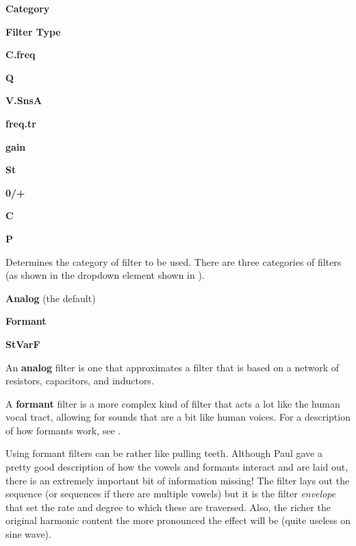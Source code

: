    \begin{enumber}
      \item \textbf{Category}
      \item \textbf{Filter Type}
      \item \textbf{C.freq}
      \item \textbf{Q}
      \item \textbf{V.SnsA}
      \item \textbf{freq.tr}
      \item \textbf{gain}
      \item \textbf{St}
      \item \textbf{0/+}
      \item \textbf{C}
      \item \textbf{P}
   \end{enumber}

   \setcounter{ItemCounter}{0}      %

   Determines the category of filter to be used.
   There are three categories of filters
   (as shown in the dropdown element shown in
   ).

\begin{enumber}                     %
   \item \textbf{Analog} (the default)
   \item \textbf{Formant}
   \item \textbf{StVarF}
\end{enumber}

   An \textbf{analog} filter
   is one that approximates a filter that is based on
   a network of resistors, capacitors, and inductors.

   A \textbf{formant} filter
   is a more complex kind of filter that acts a lot
   like the human vocal tract, allowing for sounds that
   are a bit like human voices.  For a description of how formants work,
   see .

   Using formant filters can be rather like pulling teeth.  Although Paul gave
   a pretty good description of how the vowels and formants interact and are
   laid out, there is an extremely important bit of information missing!  The
   filter lays out the sequence (or sequences if there are multiple vowels) but
   it is the filter \textsl{envelope} that set the rate and degree to which
   these are traversed. Also, the richer the original harmonic content the more
   pronounced the effect will be (quite useless on sine wave).

